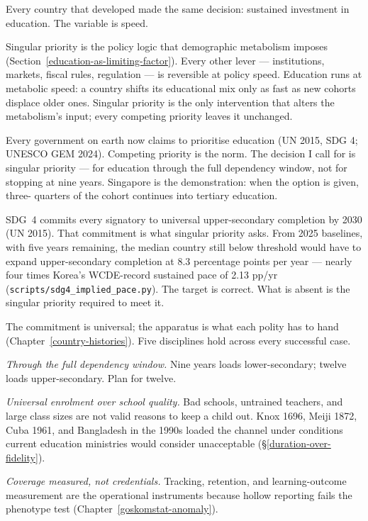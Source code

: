 \documentclass[12pt,letterpaper]{article}
\begin{document}
Every country that developed made the same decision: sustained
investment in education. The variable is speed.

Singular priority is the policy logic that demographic metabolism
imposes (Section~\ref{education-as-limiting-factor}). Every other
lever --- institutions, markets, fiscal rules, regulation --- is
reversible at policy speed. Education runs at metabolic speed: a
country shifts its educational mix only as fast as new cohorts
displace older ones. Singular priority is the only intervention
that alters the metabolism's input; every competing priority
leaves it unchanged.

Every government on earth now claims to prioritise education (UN
2015, SDG 4; UNESCO GEM 2024). Competing priority is the norm. The
decision I call for is singular priority --- for education through
the full dependency window, not for stopping at nine years.
Singapore is the demonstration: when the option is given, three-
quarters of the cohort continues into tertiary education.

SDG~4 commits every signatory to universal upper-secondary completion
by 2030 (UN 2015). That commitment is what singular priority asks.
From 2025 baselines, with five years remaining, the median country
still below threshold would have to expand upper-secondary completion
at 8.3 percentage points per year --- nearly four times Korea's
WCDE-record sustained pace of 2.13 pp/yr
(\nolinkurl{scripts/sdg4_implied_pace.py}). The target is correct.
What is absent is the singular priority required to meet it.

The commitment is universal; the apparatus is what each polity has
to hand (Chapter~\ref{country-histories}). Five disciplines hold
across every successful case.

\emph{Through the full dependency window.} Nine years loads
lower-secondary; twelve loads upper-secondary. Plan for twelve.

\emph{Universal enrolment over school quality.} Bad schools,
untrained teachers, and large class sizes are not valid reasons to
keep a child out. Knox 1696, Meiji 1872, Cuba 1961, and Bangladesh
in the 1990s loaded the channel under conditions current education
ministries would consider unacceptable
(\S\ref{duration-over-fidelity}).

\emph{Coverage measured, not credentials.} Tracking, retention, and
learning-outcome measurement are the operational instruments
because hollow reporting fails the phenotype test
(Chapter~\ref{goskomstat-anomaly}).
\end{document}
